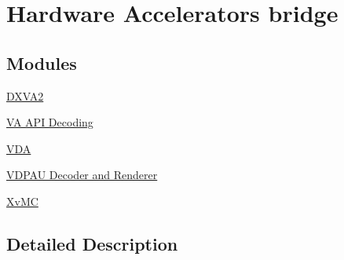 \hypertarget{group__lavc__codec__hwaccel}{}\section{Hardware Accelerators bridge}
\label{group__lavc__codec__hwaccel}
\subsection*{Modules}
\begin{DoxyCompactItemize}
\item 
\hyperlink{group__lavc__codec__hwaccel__dxva2}{D\+X\+V\+A2}
\item 
\hyperlink{group__lavc__codec__hwaccel__vaapi}{V\+A A\+P\+I Decoding}
\item 
\hyperlink{group__lavc__codec__hwaccel__vda}{V\+DA}
\item 
\hyperlink{group__lavc__codec__hwaccel__vdpau}{V\+D\+P\+A\+U Decoder and Renderer}
\item 
\hyperlink{group__lavc__codec__hwaccel__xvmc}{Xv\+MC}
\end{DoxyCompactItemize}


\subsection{Detailed Description}
